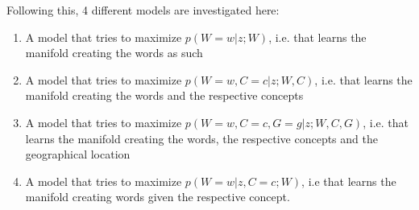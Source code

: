 \documentclass[8pt]{article}
\begin{document}
{%
%
%
%
%
%
%
%
%
%
%

%
%
%
%

Following this, 4 different models are investigated here:
\begin{enumerate}
\item A model that tries to maximize $p(W=w|z;W)$, i.e. that learns the manifold creating the words as such
\item A model that tries to maximize $p(W=w,C=c|z;W,C)$, i.e. that learns the manifold creating the words and the respective concepts
\item A model that tries to maximize $p(W=w,C=c,G=g|z;W,C,G)$, i.e. that learns the manifold creating the words, the respective concepts and the geographical location
\item A model that tries to maximize $p(W=w|z,C=c;W)$, i.e that learns the manifold creating words given the respective concept.
\end{enumerate}

}
\end{document}
